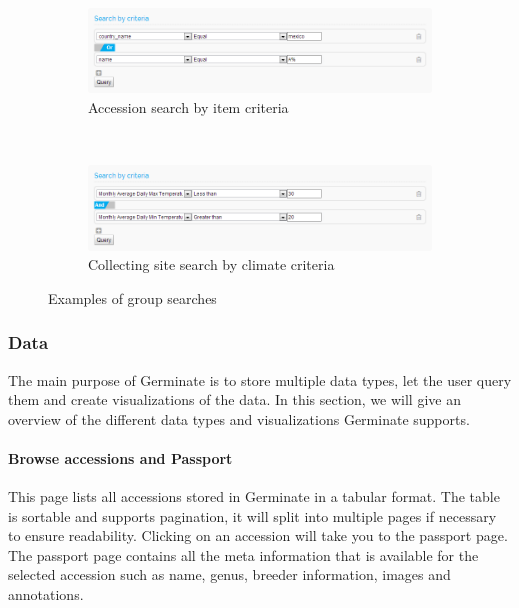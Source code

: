 \begin{figure}
    \centering
    \begin{subfigure}[t]{1.0\textwidth}
        \centering
        \includegraphics[scale=0.5]{img/features/groups_item.png}
        \caption{Accession search by item criteria}
        \label{fig:group_search_item}
    \end{subfigure}
    \\
    \begin{subfigure}[t]{1.0\textwidth}
        \centering
        \includegraphics[scale=0.5]{img/features/groups_climate.png}
        \caption{Collecting site search by climate criteria}
        \label{fig:group_search_climate}
    \end{subfigure}
    \caption{Examples of group searches}
    \label{fig:group_search}
\end{figure}

\subsubsection{Data}
The main purpose of Germinate is to store multiple data types, let the user query them and create visualizations of the data. In this section, we will give an overview of the different data types and visualizations Germinate supports.

\paragraph{Browse accessions and Passport}
This page lists all accessions stored in Germinate in a tabular format. The table is sortable and supports pagination, \ie it will split into multiple pages if necessary to ensure readability. Clicking on an accession will take you to the passport page. The passport page contains all the meta information that is available for the selected accession such as name, genus, breeder information, images and annotations.

